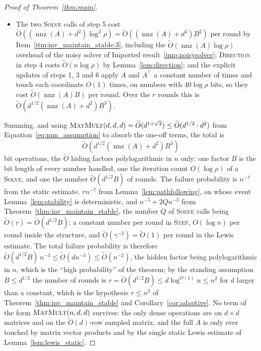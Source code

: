 \documentclass[11pt]{article}
\newcommand{\nnz}{\operatorname{nnz}}
\newcommand{\MM}{\textsc{MatMult}}
\renewcommand{\O}{\widetilde O}
\begin{document}
\begin{proof}[Proof of Theorem~\ref{thm:main}]
\begin{itemize}
  \textsc{Update} calls over the $r$ rounds cost
\[
\O\left( r \left( \nnz(A) + d^{2} \right) \log^{2} \rho \right)
=
\O\left( d^{1/2} \left( \nnz(A) + d^{2} \right) B^{3} \right)
\]
in total.
\item The two \textsc{Solve} calls of step 5 cost
  $\O((\nnz(A) + d^{2}) \log^{2} \rho) = \O((\nnz(A) + d^{2}) B^{2})$
  per round by Item~\ref{itm:inv_maintain_stable:3}, including the
  $\O(\nnz(A) \log \rho)$ overhead of the noisy solver of Imported
  result~\ref{imp:noisysolver}; \textsc{Direction} in step 4 costs
  $\O(n \log \rho)$ by Lemma~\ref{lem:direction}; and the explicit
  updates of steps 1, 3 and 6 apply
  $A$ and
  $A^\top$ a constant number of times and touch each coordinate
  $O(1)$ times, on numbers with
  $40 \log \rho$ bits, so they cost
  $\O(\nnz(A) B)$ per round. Over the
  $r$ rounds this is
  $\O(d^{1/2} (\nnz(A) + d^{2}) B^{3})$.
\end{itemize}
Summing, and using
$\MM(d, d, d) = \O(d^{1 + \sqrt{2}}) \le \O(d^{1/2} \cdot d^{2})$ from
Equation~\eqref{eq:mm_assumption} to absorb the one-off terms, the
total is
\[
\O\left( d^{1/2} \left( \nnz(A) + d^{2} \right) B^{3} \right)
\]
bit operations, the $\O$ hiding factors polylogarithmic in
$n$ only: one factor
$B$ is the bit length of every number handled, one the iteration count
$O(\log \rho)$ of a \textsc{Solve}, and one the number
$\O(d^{1/2} B)$ of rounds. The failure probability is
$n^{-7}$ from the static estimate, $r n^{-7}$ from
Lemma~\ref{lem:pathfollowing}, on whose event
Lemma~\ref{lem:stability} is deterministic, and
$n^{-5} + 2 Q n^{-3}$ from Theorem~\ref{thm:inv_maintain_stable}, the
number $Q$ of \textsc{Solve} calls being
$\O(r) = \O(d^{1/2} B)$: a constant number per round in
\textsc{Step}, $O(\log n)$ per round inside the structure, and
$\O(\gamma^{-2}) = \O(1)$ per round in the Lewis estimate. The total
failure probability is therefore $\O(d^{1/2} B) \, n^{-3} \le \O(d n^{-3}) \le \O(n^{-2})$,
the hidden factor being polylogarithmic in $n$, which is
the ``high probability'' of the theorem; by the standing assumption
$B \le d^{1/2}$ the number of rounds is
$r = \O(d^{1/2} B) \le d \log^{O(1)} n \le n^{2}$ for
$d$ larger than a constant, which is the hypothesis
$r \le n^{2}$ of Theorem~\ref{thm:inv_maintain_stable} and
Corollary~\ref{cor:adaptive}. No
term of
the form $\MM(n, d, d)$ survives: the only dense operations are on
$d \times d$ matrices and on the
$\O(d)$-row sampled matrix, and the full
$A$ is only ever touched by matrix vector products and by the single
static Lewis estimate of Lemma~\ref{lem:lewis_static}.
\end{proof}
\end{document}

